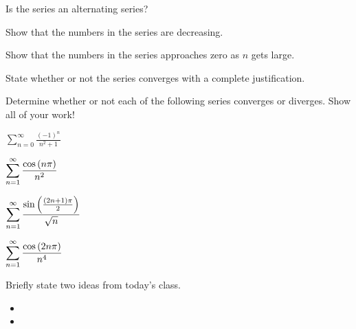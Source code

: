 \begin{problem}
\begin{subproblem}
    \item Is the series an alternating series?
      \vfill

    \item Show that the numbers in the series are decreasing.
      \vfill

    \item Show that the numbers in the series approaches zero as $n$ gets large.
      \vfill

    \item State whether or not the series converges with a complete justification.
      \vspace{2em}

  \end{subproblem}

  \clearpage

\item Determine whether or not each of the following series converges
  or diverges. Show all of your work!
  \begin{subproblem}
    \item $\displaystyle \sum_{n=0}^\infty \frac{(-1)^n}{n^2+1}$
      \vfill
    \item $\displaystyle \sum_{n=1}^\infty \frac{\cos\left( n\pi \right)}{n^2}$
      \vfill
      \clearpage
    \item $\displaystyle \sum_{n=1}^\infty \frac{\sin\left(\frac{(2n+1)\pi}{2}\right)}{\sqrt{n}} $
      \vfill
    \item $\displaystyle \sum_{n=1}^\infty \frac{\cos\left( 2n\pi \right)}{n^4}$
      \vfill
  \end{subproblem}
\end{problem}


\postClass

\begin{problem}
\item Briefly state two ideas from today's class.
  \begin{itemize}
  \item
  \item
  \end{itemize}
\item
  \begin{subproblem}
    \item
  \end{subproblem}
\end{problem}

